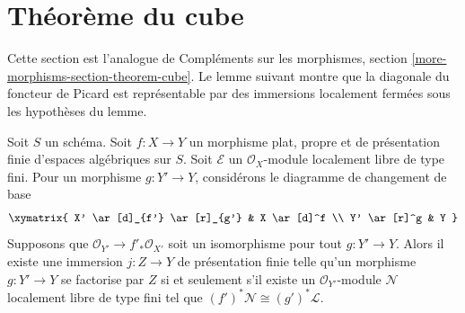 \section{Théorème du cube}
\label{section-theorem-cube}

\noindent
Cette section est l'analogue de Compléments sur les morphismes, section
\ref{more-morphisms-section-theorem-cube}.
Le lemme suivant montre que la diagonale du foncteur de Picard
est représentable par des immersions localement fermées sous
les hypothèses du lemme.

\begin{lemma}
\label{lemma-diagonal-picard-flat-proper}
Soit $S$ un schéma.
Soit $f : X \to Y$ un morphisme plat, propre et de présentation finie
d'espaces algébriques sur $S$.
Soit $\mathcal{E}$ un $\mathcal{O}_X$-module localement libre de type fini.
Pour un morphisme $g : Y' \to Y$, considérons le diagramme de changement de base
$$
\xymatrix{
X' \ar[d]_{f'} \ar[r]_{g'} & X \ar[d]^f \\
Y' \ar[r]^g & Y
}
$$
Supposons que $\mathcal{O}_{Y'} \to f'_*\mathcal{O}_{X'}$ soit un
isomorphisme pour tout $g : Y' \to Y$.
Alors il existe une immersion $j : Z \to Y$ de présentation finie
telle qu'un morphisme $g : Y' \to Y$ se factorise par $Z$ si et seulement s'il
existe un $\mathcal{O}_{Y'}$-module $\mathcal{N}$ localement libre de type fini
tel que $(f')^*\mathcal{N} \cong (g')^*\mathcal{L}$.
\end{lemma}

